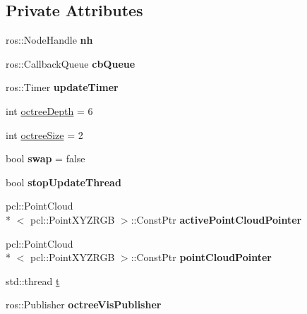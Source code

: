 \subsection*{Private Attributes}
\begin{DoxyCompactItemize}
\item 
\hypertarget{classCollisionScene_a30b43dd54810ba4ba85ce0736b061c45}{ros\-::\-Node\-Handle {\bfseries nh}}\label{classCollisionScene_a30b43dd54810ba4ba85ce0736b061c45}

\item 
\hypertarget{classCollisionScene_afaf7a12837bb9694b0df4d2a3888405d}{ros\-::\-Callback\-Queue {\bfseries cb\-Queue}}\label{classCollisionScene_afaf7a12837bb9694b0df4d2a3888405d}

\item 
\hypertarget{classCollisionScene_ac715ff5694a1b35aea05835c9c50716d}{ros\-::\-Timer {\bfseries update\-Timer}}\label{classCollisionScene_ac715ff5694a1b35aea05835c9c50716d}

\item 
int \hyperlink{classCollisionScene_a7b106dc5a0338af700abaf62d6d77ad9}{octree\-Depth} = 6
\item 
int \hyperlink{classCollisionScene_aa50f77359129b8a44335d76ee3420cc7}{octree\-Size} = 2
\item 
\hypertarget{classCollisionScene_acad20b472c7f6a8acd6fafcaa9fe35e5}{bool {\bfseries swap} = false}\label{classCollisionScene_acad20b472c7f6a8acd6fafcaa9fe35e5}

\item 
\hypertarget{classCollisionScene_a0bf30bd2de0b64092e215f0d1e45a28a}{bool {\bfseries stop\-Update\-Thread}}\label{classCollisionScene_a0bf30bd2de0b64092e215f0d1e45a28a}

\item 
\hypertarget{classCollisionScene_a1d885afac5e533d6972b31148c22fc35}{pcl\-::\-Point\-Cloud\\*
$<$ pcl\-::\-Point\-X\-Y\-Z\-R\-G\-B $>$\-::Const\-Ptr {\bfseries active\-Point\-Cloud\-Pointer}}\label{classCollisionScene_a1d885afac5e533d6972b31148c22fc35}

\item 
\hypertarget{classCollisionScene_aee8373f709dd3efa1300f676f783d2bc}{pcl\-::\-Point\-Cloud\\*
$<$ pcl\-::\-Point\-X\-Y\-Z\-R\-G\-B $>$\-::Const\-Ptr {\bfseries point\-Cloud\-Pointer}}\label{classCollisionScene_aee8373f709dd3efa1300f676f783d2bc}

\item 
std\-::thread \hyperlink{classCollisionScene_af8a098eaddd613c3312f63c4b6a99a1a}{t}
\item 
\hypertarget{classCollisionScene_acec1a566d8788d3d6de7da58dcb80ec4}{ros\-::\-Publisher {\bfseries octree\-Vis\-Publisher}}\label{classCollisionScene_acec1a566d8788d3d6de7da58dcb80ec4}


\end{DoxyCompactItemize}
